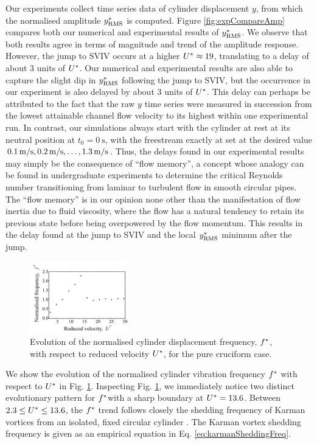 \documentclass[oneside]{utmthesis}
\begin{document}
Our experiments collect time series data of cylinder displacement $y$, from which the normalised \rms{} amplitude $y^{*}_{\text{RMS}}$ is computed. Figure \ref{fig:expCompareAmp} compares both our numerical and experimental results of $y^{*}_{\text{RMS}}$. We observe that both results agree in terms of magnitude and trend of the amplitude response. However, the jump to SVIV occurs at a higher $U^{*} \approx 19$, translating to a delay of about 3 units of $U^{*}$. Our numerical and experimental results are also able to capture the slight dip in $y^{*}_{\text{RMS}}$ following the jump to SVIV, but the occurrence in our experiment is also delayed by about 3 units of $U^{*}$. This delay can perhaps be attributed to the fact that the raw $y$ time series were measured in succession from the lowest attainable channel flow velocity \uth{} to its highest \uel{} within one experimental run. In contrast, our simulations always start with the cylinder at rest at its neutral position at $t_{0} = \SI{0}{\second}$, with the freestream exactly at set at the desired value $\uon, \utw, \dots, \utt$. Thus, the delays found in our experimental results may simply be the consequence of ``flow memory'', a concept whose analogy can be found in undergraduate experiments to determine the critical Reynolds number transitioning from laminar to turbulent flow in smooth circular pipes. The ``flow memory'' is in our opinion none other than the manifestation of flow inertia due to fluid viscosity, where the flow has a natural tendency to retain its previous state before being overpowered by the flow momentum. This results in the delay found at the jump to SVIV and the local $y^{*}_{\text{RMS}}$ minimum after the jump.

\begin{figure}
  \centering
  \includegraphics[width=0.38\textwidth]{figs/yStrFreq5}
  \caption{Evolution of the normalised cylinder displacement frequency, $f^{*}$, with respect to reduced velocity $U^{*}$, for the pure cruciform case.}
  \label{fig:yStrFreq5}
\end{figure}

We show the evolution of the normalised cylinder vibration frequency $f^{*}$ with respect to $U^{*}$ in Fig. \ref{fig:yStrFreq5}. Inspecting Fig. \ref{fig:yStrFreq5}, we immediately notice two distinct evolutionary pattern for $f^{*}$with a sharp boundary at $U^{*} = 13.6$. Between $2.3 \leq U^{*} \leq 13.6$, the $f^{*}$ trend follows closely the shedding frequency of Karman vortices from an isolated, fixed circular cylinder \citep{Blevins1990}. The Karman vortex shedding frequency is given as an empirical equation in Eq. \ref{eq:karmanSheddingFreq}.
\end{document}
